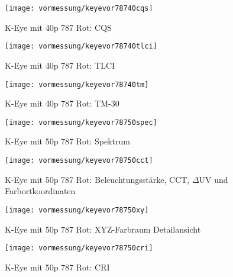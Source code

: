 \documentclass[pagesize,paper=A4,fontsize=12pt,utf8,numbers=noenddot,bibliography=totoc,listof=totoc,DIV=11,BCOR=1mm]{scrreprt}
\begin{document}
\begin{figure}[htp]     %
\centering
\texttt{[image: vormessung/keyevor78740cqs]} 
\caption {K-Eye mit 40p 787 Rot: CQS} 
\end{figure}

\begin{figure}[htp]     %
\centering
\texttt{[image: vormessung/keyevor78740tlci]} 
\caption {K-Eye mit 40p 787 Rot: TLCI} 
\end{figure}

\begin{figure}[htp]     %
\centering
\texttt{[image: vormessung/keyevor78740tm]} 
\caption {K-Eye mit 40p 787 Rot: TM-30} 
\end{figure}




\begin{figure}[htp]     %
\centering
\texttt{[image: vormessung/keyevor78750spec]} 
\caption {K-Eye mit 50p 787 Rot: Spektrum} 
\end{figure}

\begin{figure}[htp]     %
\centering
\texttt{[image: vormessung/keyevor78750cct]} 
\caption {K-Eye mit 50p 787 Rot: Beleuchtungsstärke, CCT, $\Delta$UV und Farbortkoordinaten} 
\end{figure}

\begin{figure}[htp]     %
\centering
\texttt{[image: vormessung/keyevor78750xy]} 
\caption {K-Eye mit 50p 787 Rot: XYZ-Farbraum Detailansicht} 
\end{figure}

\begin{figure}[htp]     %
\centering
\texttt{[image: vormessung/keyevor78750cri]} 
\caption {K-Eye mit 50p 787 Rot: CRI} 
\end{figure}
\end{document}
